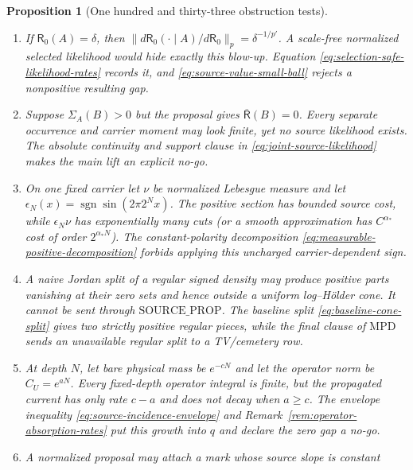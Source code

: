 \documentclass[11pt]{article}
\newtheorem{proposition}[theorem]{Proposition}
\begin{document}
\begin{proposition}[One hundred and thirty-three obstruction tests]
\begin{enumerate}[label=\textup{(T\arabic*)}]
      $D_h^0$ branch on which the source energy is one.  Conditioning a
      reference law on that cell would inherit a false order-$\delta_h$
      bound.  The fixed-before-selection proposal
      \eqref{eq:proposal-lift} and the unnormalized density $Z_A$ in
      \eqref{eq:joint-source-likelihood} force the selector rarity into
      $a_A^L$.
\item If $\mathsf R_0(A)=\delta$, then
      $\|d\mathsf R_0(\cdot\mid A)/d\mathsf R_0\|_p
       =\delta^{-1/p'}$.  A scale-free normalized selected likelihood would
      hide exactly this blow-up.  Equation
      \eqref{eq:selection-safe-likelihood-rates} records it, and
      \eqref{eq:source-value-small-ball} rejects a nonpositive resulting
      gap.
\item Suppose $\Sigma_A(B)>0$ but the proposal gives
      $\overline{\mathsf R}(B)=0$.  Every separate occurrence and carrier
      moment may look finite, yet no source likelihood exists.  The absolute
      continuity and support clause in \eqref{eq:joint-source-likelihood}
      makes the main lift an explicit no-go.
\item On one fixed carrier let $\nu$ be normalized Lebesgue measure and let
      $\epsilon_N(x)=\operatorname{sgn}\sin(2\pi2^Nx)$.  The positive
      section has bounded source cost, while $\epsilon_N\nu$ has
      exponentially many cuts (or a smooth approximation has
      $C^{\alpha_*}$ cost of order $2^{\alpha_*N}$).  The constant-polarity
      decomposition \eqref{eq:measurable-positive-decomposition} forbids
      applying this uncharged carrier-dependent sign.
\item A naive Jordan split of a regular signed density may produce positive
      parts vanishing at their zero sets and hence outside a uniform
      log--H\"older cone.  It cannot be sent through
      $\mathrm{SOURCE\_PROP}$.  The baseline split
      \eqref{eq:baseline-cone-split} gives two strictly positive regular
      pieces, while the final clause of $\mathrm{MPD}$ sends an unavailable
      regular split to a TV/cemetery row.
\item At depth $N$, let bare physical mass be $e^{-cN}$ and let the operator
      norm be $C_U=e^{aN}$.  Every fixed-depth operator integral is finite,
      but the propagated current has only rate $c-a$ and does not decay when
      $a\ge c$.  The envelope inequality
      \eqref{eq:source-incidence-envelope} and
      Remark~\ref{rem:operator-absorption-rates} put this growth into $q$ and
      declare the zero gap a no-go.
\item A normalized proposal may attach a mark whose source slope is constant

\end{enumerate}
\end{proposition}
\end{document}
